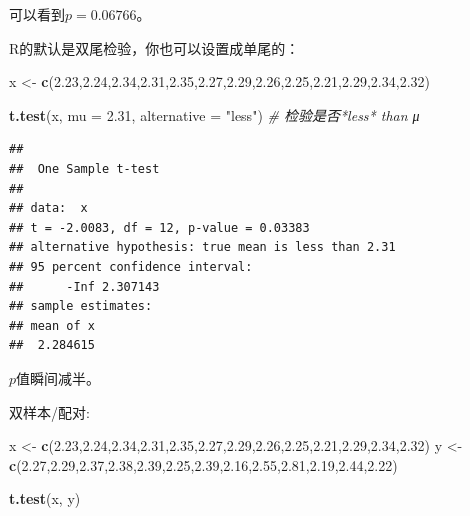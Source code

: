 \documentclass[]{book}
\newenvironment{Shaded}{\begin{snugshade}}{\end{snugshade}}
\newcommand{\CommentTok}[1]{\textcolor[rgb]{0.56,0.35,0.01}{\textit{#1}}}
\newcommand{\DataTypeTok}[1]{\textcolor[rgb]{0.13,0.29,0.53}{#1}}
\newcommand{\FloatTok}[1]{\textcolor[rgb]{0.00,0.00,0.81}{#1}}
\newcommand{\KeywordTok}[1]{\textcolor[rgb]{0.13,0.29,0.53}{\textbf{#1}}}
\newcommand{\NormalTok}[1]{#1}
\newcommand{\StringTok}[1]{\textcolor[rgb]{0.31,0.60,0.02}{#1}}
\begin{document}
可以看到\(p=0.06766\)。

R的默认是双尾检验，你也可以设置成单尾的：

\begin{Shaded}
\begin{Highlighting}[]
\NormalTok{x <-}\StringTok{ }\KeywordTok{c}\NormalTok{(}\FloatTok{2.23}\NormalTok{,}\FloatTok{2.24}\NormalTok{,}\FloatTok{2.34}\NormalTok{,}\FloatTok{2.31}\NormalTok{,}\FloatTok{2.35}\NormalTok{,}\FloatTok{2.27}\NormalTok{,}\FloatTok{2.29}\NormalTok{,}\FloatTok{2.26}\NormalTok{,}\FloatTok{2.25}\NormalTok{,}\FloatTok{2.21}\NormalTok{,}\FloatTok{2.29}\NormalTok{,}\FloatTok{2.34}\NormalTok{,}\FloatTok{2.32}\NormalTok{)}

\KeywordTok{t.test}\NormalTok{(x, }\DataTypeTok{mu =} \FloatTok{2.31}\NormalTok{, }\DataTypeTok{alternative =} \StringTok{"less"}\NormalTok{) }\CommentTok{# 检验是否*less* than μ}
\end{Highlighting}
\end{Shaded}

\begin{verbatim}
## 
##  One Sample t-test
## 
## data:  x
## t = -2.0083, df = 12, p-value = 0.03383
## alternative hypothesis: true mean is less than 2.31
## 95 percent confidence interval:
##      -Inf 2.307143
## sample estimates:
## mean of x 
##  2.284615
\end{verbatim}

\(p\)值瞬间减半。

双样本/配对:

\begin{Shaded}
\begin{Highlighting}[]
\NormalTok{x <-}\StringTok{ }\KeywordTok{c}\NormalTok{(}\FloatTok{2.23}\NormalTok{,}\FloatTok{2.24}\NormalTok{,}\FloatTok{2.34}\NormalTok{,}\FloatTok{2.31}\NormalTok{,}\FloatTok{2.35}\NormalTok{,}\FloatTok{2.27}\NormalTok{,}\FloatTok{2.29}\NormalTok{,}\FloatTok{2.26}\NormalTok{,}\FloatTok{2.25}\NormalTok{,}\FloatTok{2.21}\NormalTok{,}\FloatTok{2.29}\NormalTok{,}\FloatTok{2.34}\NormalTok{,}\FloatTok{2.32}\NormalTok{)}
\NormalTok{y <-}\StringTok{ }\KeywordTok{c}\NormalTok{(}\FloatTok{2.27}\NormalTok{,}\FloatTok{2.29}\NormalTok{,}\FloatTok{2.37}\NormalTok{,}\FloatTok{2.38}\NormalTok{,}\FloatTok{2.39}\NormalTok{,}\FloatTok{2.25}\NormalTok{,}\FloatTok{2.39}\NormalTok{,}\FloatTok{2.16}\NormalTok{,}\FloatTok{2.55}\NormalTok{,}\FloatTok{2.81}\NormalTok{,}\FloatTok{2.19}\NormalTok{,}\FloatTok{2.44}\NormalTok{,}\FloatTok{2.22}\NormalTok{)}

\KeywordTok{t.test}\NormalTok{(x, y)}
\end{Highlighting}
\end{Shaded}
\end{document}
